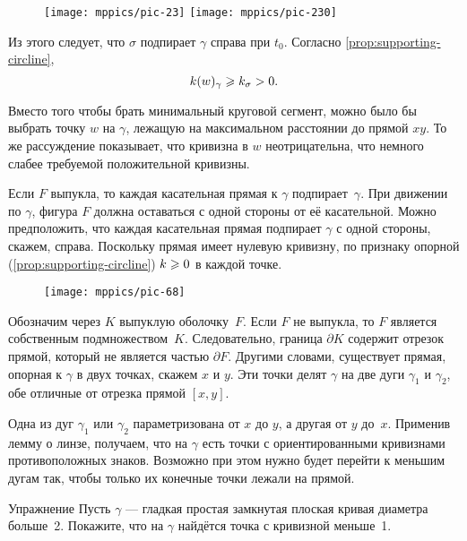 \begin{wrapfigure}{o}{50 mm}
\vskip-4mm
\centering
\texttt{[image: mppics/pic-23]}
\bigskip
\texttt{[image: mppics/pic-230]}
\end{wrapfigure}

Из этого следует, что $\sigma$ подпирает $\gamma$ справа при $t_0$.
Согласно \ref{prop:supporting-circline},
\[k(w)_\gamma\geqslant k_\sigma >0.\]
\qedsf

Вместо того чтобы брать минимальный круговой сегмент, можно было бы выбрать точку $w$ на $\gamma$, лежащую на максимальном расстоянии до прямой $xy$.
То же рассуждение показывает, что кривизна в $w$ неотрицательна, что немного слабее требуемой положительной кривизны.


Если $F$ выпукла, то каждая касательная прямая к $\gamma$ подпирает~$\gamma$.
При движении по $\gamma$, фигура $F$ должна оставаться с одной стороны от её касательной.
Можно предположить, что каждая касательная прямая подпирает $\gamma$ с одной стороны, скажем, справа.
Поскольку прямая имеет нулевую кривизну, по признаку опорной (\ref{prop:supporting-circline}) $k\geqslant 0$ в каждой точке.

\begin{wrapfigure}{r}{35 mm}
\vskip-3mm
\centering
\texttt{[image: mppics/pic-68]}
\vskip0mm
\end{wrapfigure}

Обозначим через $K$ выпуклую оболочку~$F$.
Если $F$ не выпукла, то $F$ является собственным подмножеством~$K$.
Следовательно, граница $\partial K$ содержит отрезок прямой, который не является частью $\partial F$.
Другими словами, существует прямая, опорная к $\gamma$ в двух точках, скажем $x$ и $y$.
Эти точки делят $\gamma$ на две дуги $\gamma_1$ и $\gamma_2$, обе отличные от отрезка прямой $[x,y]$.

Одна из дуг $\gamma_1$ или $\gamma_2$ параметризована от $x$ до $y$, а другая от $y$ до~$x$.
Применив лемму о линзе, получаем, что на $\gamma$ есть точки с ориентированными кривизнами противоположных знаков.
Возможно при этом нужно будет перейти к меньшим дугам так, чтобы только их конечные точки лежали на прямой. 
\qeds


\begin{thm}{Упражнение}\label{ex:convex small}
Пусть $\gamma$ --- гладкая простая замкнутая плоская кривая диаметра больше~2.
Покажите, что на $\gamma$ найдётся точка с кривизной меньше~1.
\end{thm}

